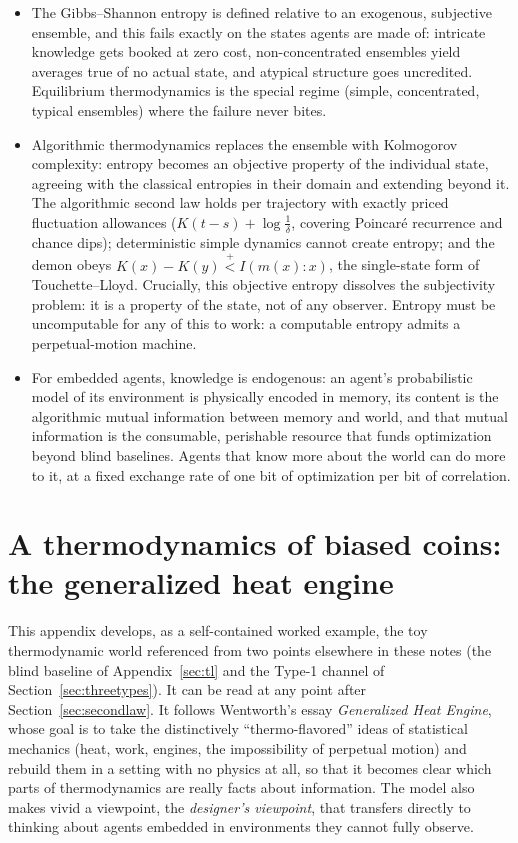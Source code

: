 \documentclass[10pt]{article}
\theoremstyle{definition}
\theoremstyle{remark}
\newcommand{\plt}{\mathrel{\stackrel{+}{<}}}
\begin{document}
\begin{itemize}[leftmargin=2em]
  \item The Gibbs--Shannon entropy is defined relative to an exogenous, subjective ensemble, and this fails exactly on the states agents are made of: intricate knowledge gets booked at zero cost, non-concentrated ensembles yield averages true of no actual state, and atypical structure goes uncredited. Equilibrium thermodynamics is the special regime (simple, concentrated, typical ensembles) where the failure never bites.
  \item Algorithmic thermodynamics replaces the ensemble with Kolmogorov complexity: entropy becomes an objective property of the individual state, agreeing with the classical entropies in their domain and extending beyond it. The algorithmic second law holds per trajectory with exactly priced fluctuation allowances ($K(t-s) + \log\frac1\delta$, covering Poincar\'e recurrence and chance dips); deterministic simple dynamics cannot create entropy; and the demon obeys $K(x) - K(y) \plt I(m(x):x)$, the single-state form of Touchette--Lloyd. Crucially, this objective entropy dissolves the subjectivity problem: it is a property of the state, not of any observer. Entropy must be uncomputable for any of this to work: a computable entropy admits a perpetual-motion machine.
  \item For embedded agents, knowledge is endogenous: an agent's probabilistic model of its environment is physically encoded in memory, its content is the algorithmic mutual information between memory and world, and that mutual information is the consumable, perishable resource that funds optimization beyond blind baselines. Agents that know more about the world can do more to it, at a fixed exchange rate of one bit of optimization per bit of correlation.
\end{itemize}

\appendix

\section{A thermodynamics of biased coins: the generalized heat engine}
\label{sec:coins}

This appendix develops, as a self-contained worked example, the toy thermodynamic world referenced from two points elsewhere in these notes (the blind baseline of Appendix~\ref{sec:tl} and the Type-1 channel of Section~\ref{sec:threetypes}). It can be read at any point after Section~\ref{sec:secondlaw}. It follows Wentworth's essay \emph{Generalized Heat Engine}, whose goal is to take the distinctively ``thermo-flavored'' ideas of statistical mechanics (heat, work, engines, the impossibility of perpetual motion) and rebuild them in a setting with no physics at all, so that it becomes clear which parts of thermodynamics are really facts about information. The model also makes vivid a viewpoint, the \emph{designer's viewpoint}, that transfers directly to thinking about agents embedded in environments they cannot fully observe.
\end{document}
